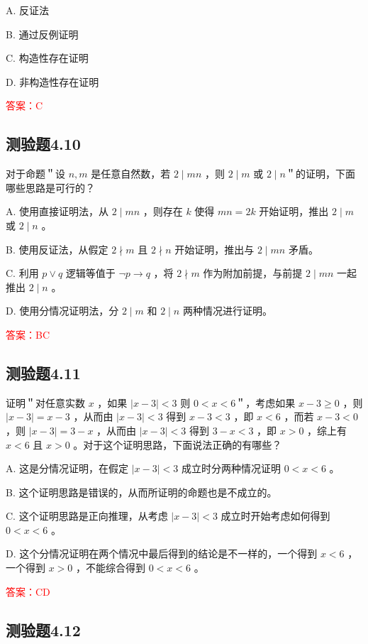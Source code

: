 \documentclass[UTF8, heading=true]{ctexart}
\begin{document}
A. 反证法

B. 通过反例证明

C. 构造性存在证明

D. 非构造性存在证明

\textcolor{red}{答案：C}

\subsection{测验题4.10}

对于命题＂设 $n, m$ 是任意自然数，若 $2 \mid m n$ ，则 $2 \mid m$ 或 $2 \mid n$＂的证明，下面哪些思路是可行的？

A. 使用直接证明法，从 $2 \mid m n$ ，则存在 $k$ 使得 $m n=2 k$ 开始证明，推出 $2 \mid m$ 或 $2 \mid n$ 。

B. 使用反证法，从假定 $2 \nmid m$ 且 $2 \nmid n$ 开始证明，推出与 $2 \mid m n$ 矛盾。

C. 利用 $p \vee q$ 逻辑等值于 $\neg p \rightarrow q$ ，将 $2 \nmid m$ 作为附加前提，与前提 $2 \mid m n$ 一起推出 $2 \mid n$ 。

D. 使用分情况证明法，分 $2 \mid m$ 和 $2 \mid n$ 两种情况进行证明。

\textcolor{red}{答案：BC}

\subsection{测验题4.11}

证明＂对任意实数 $x$ ，如果 $|x-3|<3$ 则 $0<x<6$＂，考虑如果 $x-3 \geq 0$ ，则 $|x-3|=x-3$ ，从而由 $|x-3|<3$ 得到 $x-3<3$ ，即 $x<6$ ，而若 $x-3<0$ ，则 $|x-3|=3-x$ ，从而由 $|x-3|<3$ 得到 $3-x<3$ ，即 $x>0$ ，综上有 $x<6$ 且 $x>0$ 。对于这个证明思路，下面说法正确的有哪些？

A. 这是分情况证明，在假定 $|x-3|<3$ 成立时分两种情况证明 $0<x<6$ 。

B. 这个证明思路是错误的，从而所证明的命题也是不成立的。

C. 这个证明思路是正向推理，从考虑 $|x-3|<3$ 成立时开始考虑如何得到 $0<x<6$ 。

D. 这个分情况证明在两个情况中最后得到的结论是不一样的，一个得到 $x<6$ ，一个得到 $x>0$ ，不能综合得到 $0<x<6$ 。


\textcolor{red}{答案：CD}

\subsection{测验题4.12}
\end{document}
